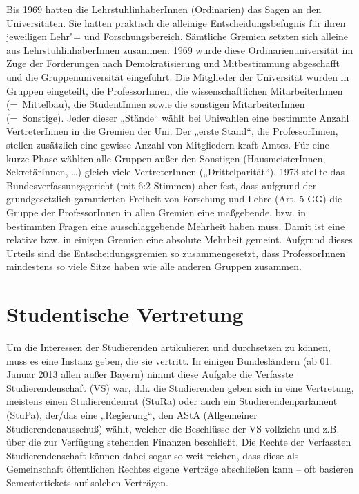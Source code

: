 Bis 1969 hatten die LehrstuhlinhaberInnen (Ordinarien) das Sagen an den
Universitäten. Sie hatten praktisch die alleinige Entscheidungsbefugnis
für ihren jeweiligen Lehr"= und Forschungsbereich. Sämtliche Gremien setzten
sich alleine aus LehrstuhlinhaberInnen zusammen. 1969 wurde diese
Ordinarienuniversität im Zuge der Forderungen nach Demokratisierung und
Mitbestimmung abgeschafft und die Gruppenuniversität eingeführt. Die
Mitglieder der Universität wurden in Gruppen eingeteilt, die
ProfessorInnen, die wissenschaftlichen MitarbeiterInnen (=\ Mittelbau), die
StudentInnen sowie die sonstigen MitarbeiterInnen (=\ Sonstige). Jeder
dieser „Stände“ wählt bei Uniwahlen eine bestimmte Anzahl VertreterInnen
in die Gremien der Uni. Der „erste Stand“, die ProfessorInnen, stellen
zusätzlich eine gewisse Anzahl von Mitgliedern kraft Amtes. Für eine kurze
Phase wählten alle Gruppen außer den Sonstigen (HausmeisterInnen,
SekretärInnen, \dots) gleich viele VertreterInnen („Drittelparität“).
1973 stellte das Bundesverfassungsgericht (mit 6:2 Stimmen) aber fest, dass
aufgrund der grundgesetzlich garantierten Freiheit von Forschung und Lehre
(Art. 5 GG) die Gruppe der ProfessorInnen in allen Gremien eine
maßgebende, bzw. in bestimmten Fragen eine ausschlaggebende Mehrheit haben
muss. Damit ist eine relative bzw. in einigen Gremien eine absolute
Mehrheit gemeint. Aufgrund dieses Urteils sind die Entscheidungsgremien so
zusammengesetzt, dass ProfessorInnen mindestens so viele Sitze haben wie
alle anderen Gruppen zusammen.

\section{Studentische Vertretung}
Um die Interessen der Studierenden artikulieren und durchsetzen zu können, muss
es eine Instanz geben, die sie vertritt. In einigen Bundesländern (ab 01.
Januar 2013 allen außer Bayern) nimmt diese Aufgabe die Verfasste
Studierendenschaft (VS) war, d.h. die Studierenden geben sich in eine
Vertretung, meistens einen Studierendenrat (StuRa) oder auch ein
Studierendenparlament (StuPa), der/das eine „Regierung“, den AStA (Allgemeiner
Studierendenausschuß) wählt, welcher die Beschlüsse der VS vollzieht und z.B.
über die zur Verfügung stehenden Finanzen beschließt. Die Rechte der
Verfassten Studierendenschaft können dabei sogar so weit reichen, dass diese
als Gemeinschaft öffentlichen Rechtes eigene Verträge abschließen kann -- oft
basieren Semestertickets auf solchen Verträgen.

